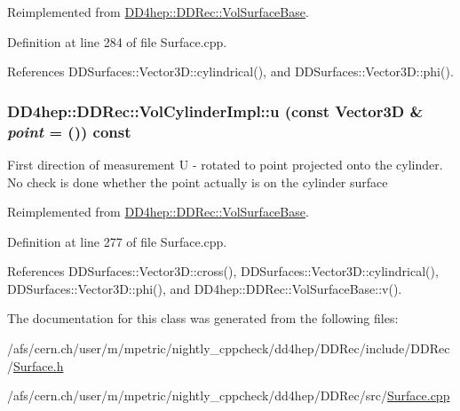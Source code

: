 Reimplemented from \hyperlink{class_d_d4hep_1_1_d_d_rec_1_1_vol_surface_base_a0689bccd5a024798609f3ce1b39c7d61}{DD4hep::DDRec::VolSurfaceBase}.

Definition at line 284 of file Surface.cpp.

References DDSurfaces::Vector3D::cylindrical(), and DDSurfaces::Vector3D::phi().\hypertarget{class_d_d4hep_1_1_d_d_rec_1_1_vol_cylinder_impl_a7c2990e721f48f65bd4fda4cfd00c976}{
\subsubsection[{u}]{ DD4hep::DDRec::VolCylinderImpl::u (const {\bf Vector3D} \& {\em point} = {()}) const}}
\label{class_d_d4hep_1_1_d_d_rec_1_1_vol_cylinder_impl_a7c2990e721f48f65bd4fda4cfd00c976}
First direction of measurement U -\/ rotated to point projected onto the cylinder. No check is done whether the point actually is on the cylinder surface 

Reimplemented from \hyperlink{class_d_d4hep_1_1_d_d_rec_1_1_vol_surface_base_a6b72381e54cf0c94ab56db4bdbc8b4a4}{DD4hep::DDRec::VolSurfaceBase}.

Definition at line 277 of file Surface.cpp.

References DDSurfaces::Vector3D::cross(), DDSurfaces::Vector3D::cylindrical(), DDSurfaces::Vector3D::phi(), and DD4hep::DDRec::VolSurfaceBase::v().

The documentation for this class was generated from the following files:\begin{DoxyCompactItemize}
\item 
/afs/cern.ch/user/m/mpetric/nightly\_\-cppcheck/dd4hep/DDRec/include/DDRec/\hyperlink{_surface_8h}{Surface.h}\item 
/afs/cern.ch/user/m/mpetric/nightly\_\-cppcheck/dd4hep/DDRec/src/\hyperlink{_surface_8cpp}{Surface.cpp}\end{DoxyCompactItemize}
